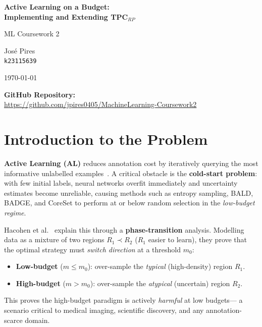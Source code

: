 \documentclass[11pt, twocolumn]{article}
\begin{document}
\begin{titlepage}
  \centering
  \vspace*{3cm}
  {\LARGE\bfseries Active Learning on a Budget:\\[0.4em]
   Implementing and Extending TPC$_{RP}$\par}
  \vspace{1.2cm}
  {\large ML Coursework 2\par}
  \vspace{1cm}
  {\large José Pires\\[0.2em]
   \texttt{k23115639}\par}
  \vfill
  {\large \today\par}
  \vspace{0.5cm}
  {\normalsize \textbf{GitHub Repository:}\\[0.2em]
   \url{https://github.com/jpires0405/MachineLearning-Coursework2}\par}
\end{titlepage}

\section{Introduction to the Problem}

\textbf{Active Learning (AL)} reduces annotation cost by iteratively querying
the most informative unlabelled examples~\cite{hacohen2022}.
A critical obstacle is the \textbf{cold-start problem}: with few initial labels,
neural networks overfit immediately and uncertainty estimates become unreliable,
causing methods such as entropy sampling, BALD, BADGE, and CoreSet to perform at
or below random selection in the \textit{low-budget regime}.

Hacohen et al.~\cite{hacohen2022} explain this through a \textbf{phase-transition}
analysis.
Modelling data as a mixture of two regions $R_1 \prec R_2$ ($R_1$ easier to
learn), they prove that the optimal strategy must \textit{switch direction} at a
threshold $m_0$:
\begin{itemize}
  \setlength\itemsep{0pt}
  \item \textbf{Low-budget} ($m \leq m_0$): over-sample the \textit{typical}
        (high-density) region $R_1$.
  \item \textbf{High-budget} ($m > m_0$): over-sample the \textit{atypical}
        (uncertain) region $R_2$.
\end{itemize}
This proves the high-budget paradigm is actively \emph{harmful} at low budgets—
a scenario critical to medical imaging, scientific discovery, and any
annotation-scarce domain.
\end{document}

